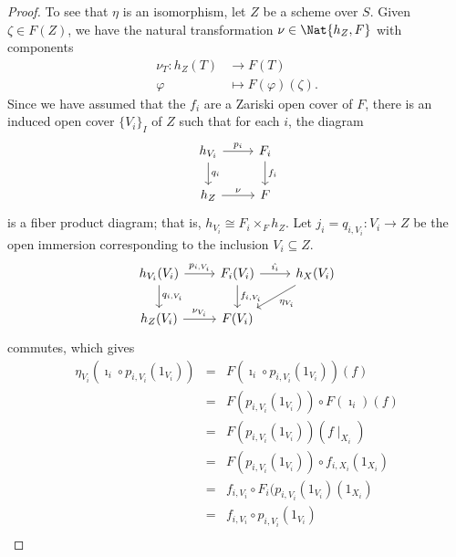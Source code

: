 \documentclass[10pt]{amsart}
\begin{document}
\begin{thm}
\begin{proof}
    To see that $\eta$ is an isomorphism, let $Z$ be a scheme over $S$.
    Given $\zeta \in F(Z)$, we have the natural transformation $\nu \in \Nat{h_Z, F}$ with components
    \begin{align*}
      \nu_T \colon h_Z(T) &\rightarrow F(T)\\
      \varphi &\mapsto F(\varphi)(\zeta).
    \end{align*}
    Since we have assumed that the $f_i$ are a Zariski open cover of $F$, there is an induced open cover $\{V_i\}_I$ of $Z$ such that for each $i$, the diagram
    $$\begin{tikzcd}
      h_{V_i} \arrow{r}{p_i}\arrow{d}{q_i} & F_i\arrow{d}{f_i}\\
      h_Z \arrow{r}{\nu} & F
    \end{tikzcd}$$
    is a fiber product diagram; that is, $h_{V_i} \cong F_i \times_F h_Z$.
    Let $j_i = q_{i,V_i} : V_i \rightarrow Z$ be the open immersion corresponding to the inclusion $V_i \subseteq Z$.
    $$\begin{tikzcd}
      h_{V_i}(V_i) \arrow{r}{p_{i,V_i}} \arrow{d}{q_{i,V_i}} & F_i(V_i)\arrow{d}{f_{i,V_i}} \arrow{r}{\hat{\imath_i}} & h_X(V_i)\arrow{ld}{\eta_{V_i}}\\
      h_Z(V_i)\arrow{r}{\nu_{V_i}} & F(V_i)
    \end{tikzcd}$$
    commutes, which gives
    \begin{eqnarray*}
      \eta_{V_i}\left(\imath_i \circ p_{i,V_i}(1_{V_i})\right) &=& F(\imath_i \circ p_{i,V_i}(1_{V_i}))(f)\\
      &=& F(p_{i,V_i}(1_{V_i})) \circ F(\imath_i)(f)\\
      &=& F(p_{i,V_i}(1_{V_i}))(f\mid_{X_i})\\
      &=& F(p_{i,V_i}(1_{V_i})) \circ f_{i,X_i}(1_{X_i})\\
      &=& f_{i,V_i} \circ F_i(p_{i,V_i}(1_{V_i})(1_{X_i})\\
      &=& f_{i,V_i} \circ p_{i,V_i}(1_{V_i})\\

\end{eqnarray*}
\end{proof}
\end{thm}
\end{document}
